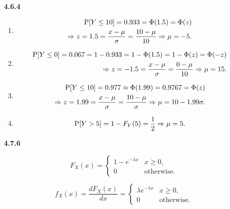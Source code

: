 \documentclass{article}
\begin{document}
\begin{enumerate}
\begin{enumerate}[label=(\alph*)]
    \end{enumerate}

    \item [\textbf{4.6.4}]

    \begin{enumerate}[label=(\alph*)]
        \item

        \begin{align*}
        \text P[Y \le 10] = 0.933 = \Phi(1.5) = \Phi(z) \\
        \Rightarrow z = 1.5 = \frac{x - \mu}{\sigma} = \frac{10 - \mu}{10} \Rightarrow \mu = -5.
        \end{align*}

        \item

        \begin{align*}
        \text P[Y \le 0] = 0.067 = 1 - 0.933 = 1 - \Phi(1.5) = 1 - \Phi(z) = \Phi(-z) \\
        \Rightarrow z = -1.5 = \frac{x - \mu}{\sigma} = \frac{0 - \mu}{10} \Rightarrow \mu = 15.
        \end{align*}

        \item

        \begin{align*}
        \text P[Y \le 10] = 0.977 \approx \Phi(1.99) = 0.9767 = \Phi(z) \\
        \Rightarrow z = 1.99 = \frac{x - \mu}{\sigma} = \frac{10 - \mu}{\sigma} \Rightarrow \mu = 10 - 1.99\sigma.
        \end{align*}

        \item

        \begin{align*}
        \text P[Y > 5] = 1 - F_Y(5) = \frac{1}{2} \Rightarrow \mu = 5.
        \end{align*}

    \end{enumerate}
    \item [\textbf{4.7.6}]

    $$
    F_X(x) =
    \begin{cases}
    1 - e^{-\lambda x} & x \ge 0, \\
    0 & \text{otherwise}.
    \end{cases}
    $$

    $$
    f_X(x) = \frac{dF_X(x)}{dx} =
    \begin{cases}
    \lambda e^{-\lambda x} & x \ge 0, \\
    0 & \text{otherwise}.
    \end{cases}
    $$


\end{enumerate}
\end{document}
